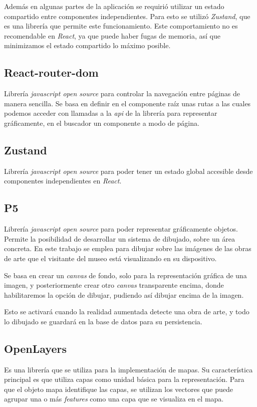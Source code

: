 Además en algunas partes de la aplicación se requirió utilizar un estado compartido entre componentes independientes. Para esto se utilizó \textit{Zustand}, que es una librería que permite este funcionamiento. Este comportamiento no es recomendable en \textit{React}, ya que puede haber fugas de memoria, así que minimizamos el estado compartido lo máximo posible.
\subsection{React-router-dom}
Librería \textit{javascript open source} para controlar la navegación entre páginas de manera sencilla. Se basa en definir en el componente raíz unas rutas a las cuales podemos acceder con llamadas a la \textit{api} de la librería para representar gráficamente, en el buscador un componente a modo de página.
\subsection{Zustand}
Librería \textit{javascript open source} para poder tener un estado global accesible desde componentes independientes en \textit{React}.
\subsection{P5}
Librería \textit{javascript open source} para poder representar gráficamente objetos. Permite la posibilidad de desarrollar un sistema de dibujado, sobre un área concreta. En este trabajo se emplea para dibujar sobre las imágenes de las obras de arte que el visitante del museo está visualizando en su dispositivo. \cite{P5} 

Se basa en crear un \textit{canvas} de fondo, solo para la representación gráfica de una imagen, y posteriormente crear otro \textit{canvas} transparente encima, donde habilitaremos la opción de dibujar, pudiendo así dibujar encima de la imagen.

Esto se activará cuando la realidad aumentada detecte una obra de arte, y todo lo dibujado se guardará en la base de datos para su persistencia.

\subsection{OpenLayers}
Es una librería que se utiliza para la implementación de mapas. Su característica principal es que utiliza capas como unidad básica para la representación. Para que el objeto mapa identifique las capas, se utilizan los vectores que puede agrupar una o más \textit{features} como una capa que se visualiza en el mapa.


